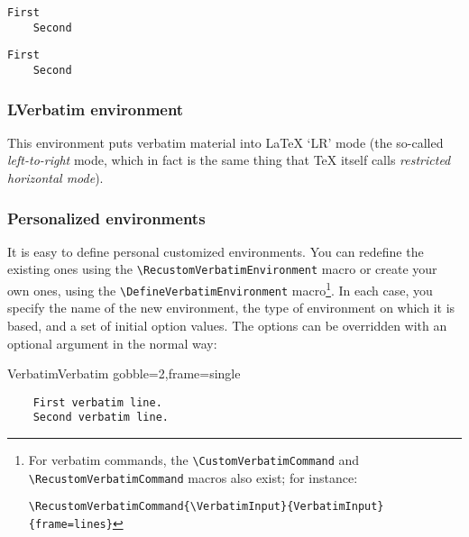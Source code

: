 \documentclass[twoside]{article}
\newif\ifChangeBar \ChangeBarfalse
\newcommand\cs[1]{\texttt{\textbackslash#1}}
\begin{document}
\begin{SideBySideExample}
  \begin{BVerbatim}[boxwidth=2cm]
    First
    Second
  \end{BVerbatim}
  \begin{BVerbatim}[boxwidth=2cm,
                    baseline=t]
    First
    Second
  \end{BVerbatim}
\end{SideBySideExample}

\subsubsection{LVerbatim environment}

  This environment puts verbatim material into \LaTeX{} `LR' mode (the
so-called \emph{left-to-right} mode, which in fact is the same thing that
\TeX{} itself calls \emph{restricted horizontal mode}).

\subsubsection{Personalized environments}

\ifChangeBar\begin{changebar}\fi
\VerbatimFootnotes
  It is easy to define personal customized environments. You can redefine
the existing ones using the \cs{RecustomVerbatimEnvironment} macro or create
your own ones, using the \cs{DefineVerbatimEnvironment} macro\footnote{%
\ifChangeBar\begin{changebar}\fi
For verbatim commands, the \cs{CustomVerbatimCommand} and
\cs{RecustomVerbatimCommand} macros also exist; for instance:

\noindent
\verb+\RecustomVerbatimCommand{\VerbatimInput}{VerbatimInput}{frame=lines}+
\ifChangeBar\end{changebar}\fi}.
In each case, you specify the name of the new environment, the type of
environment on which it is based, and a set of initial option values. The
options can be overridden with an optional argument in the normal way:

\begin{SideBySideExample}
  \RecustomVerbatimEnvironment
    {Verbatim}{Verbatim}
    {gobble=2,frame=single}
  \begin{Verbatim}
    First verbatim line.
    Second verbatim line.
  \end{Verbatim}
\end{SideBySideExample}
\ifChangeBar\end{changebar}\fi
\end{document}
